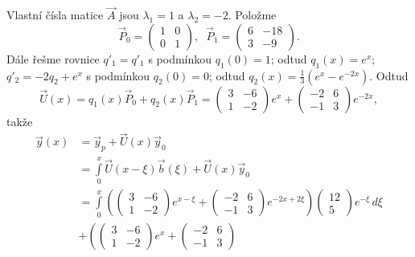 \begin{sol}
   Vlastní čísla matice $\vec{A}$ jsou $\lambda_1 = 1$ a $\lambda_2 = -2$.
   Položme
   \[
      \vec{P}_0 = \begin{pmatrix}
         1 & 0 \\ 0 & 1
      \end{pmatrix}, \;\;
      \vec{P}_1 = \begin{pmatrix}
         6 & -18 \\ 3 & -9
      \end{pmatrix}.
   \]
   Dále řešme rovnice $q'_1=q'_1$ s podmínkou $q_1(0)=1$; odtud $q_1(x)=e^{x}$;
   $q'_2=-2q_2+e^x$ s podmínkou $q_2(0)=0$; odtud $q_2(x)=\frac{1}{3}(e^x-e^{-2x})$.
   Odtud
   \[
      \vec{U}(x)=q_1(x)\vec{P}_0+q_2(x)\vec{P}_1 = 
      \begin{pmatrix}
         3 & -6 \\ 1 & -2
      \end{pmatrix}
      e^x
      +
      \begin{pmatrix}
         -2 & 6 \\ -1 & 3
      \end{pmatrix}
      e^{-2x},
   \]
   takže
   \[
     \begin{split}
        \vec{y}(x) &= \vec{y}_p + \vec{U}(x)\vec{y}_0\\
                   &= \int\limits_0^x\vec{U}(x-\xi)\vec{b}(\xi)+\vec{U}(x)\vec{y}_0\\
                   &= \int\limits_0^x\left(
                         \begin{pmatrix}3 & -6 \\ 1 & -2\end{pmatrix}e^{x-\xi}+\begin{pmatrix}-2 & 6 \\ -1 & 3\end{pmatrix}e^{-2x+2\xi}\right)
                         \begin{pmatrix}12 \\ 5\end{pmatrix}e^{-\xi}\,d\xi\\
                    &+\left(
                           \begin{pmatrix}
                              3 & -6 \\ 1 & -2
                           \end{pmatrix}
                           e^x
                           +
                           \begin{pmatrix}
                              -2 & 6 \\ -1 & 3

\end{pmatrix}
\end{split}\]
\end{sol}
